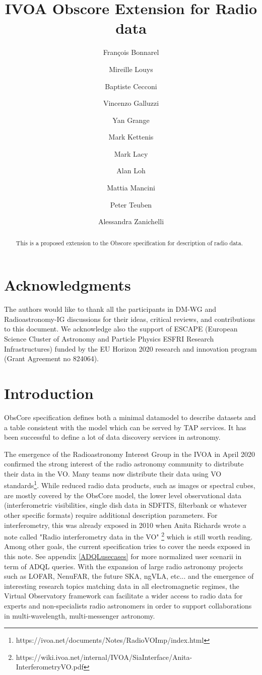 \documentclass[11pt,a4paper]{ivoa}
\title{IVOA Obscore Extension for Radio data}
\author{Fran\c cois Bonnarel}
\author{Mireille Louys}
\author{Baptiste Cecconi}
\author{Vincenzo Galluzzi}
\author{Yan Grange}
\author{Mark Kettenis}
\author{Mark Lacy}
\author{Alan Loh}
\author{Mattia Mancini}
\author{Peter Teuben}
\author{Alessandra Zanichelli}
\begin{document}
\begin{abstract}
This is a proposed extension to the Obscore specification for description of radio data.
\end{abstract}

\section*{Acknowledgments}

The authors would like to thank all the participants in DM-WG and Radioastronomy-IG discussions 
for their ideas, critical reviews, and contributions to this document.
We acknowledge also the support of  ESCAPE (European Science Cluster of Astronomy
and Particle Physics ESFRI Research Infrastructures) funded by the EU Horizon
2020 research and innovation program (Grant Agreement no 824064).

\section{Introduction}


ObsCore specification \citep{2017ivoa.spec.0509L} defines both a minimal datamodel to describe datasets 
and a table consistent with the model which can be served by TAP services. It has been successful 
to define a lot of data discovery services in astronomy.

The emergence  of  the Radioastronomy Interest Group in the IVOA in April 2020 confirmed the strong 
interest of the radio astronomy community to distribute their data in the VO. Many teams now 
distribute their data using VO standards\footnote{https://ivoa.net/documents/Notes/RadioVOImp/index.html}. 
While reduced radio data products, such as images or spectral cubes,%
are mostly covered by the ObsCore model, the lower level observational data 
(interferometric visibilities, single dish data in SDFITS, filterbank or whatever other specific formats) require additional description parameters. For interferometry, this was already exposed 
in 2010 when Anita Richards wrote a note called "Radio interferometry data in the VO" 
\footnote{https://wiki.ivoa.net/internal/IVOA/SiaInterface/Anita-InterferometryVO.pdf} which is 
still worth reading. Among other goals, the current specification tries to cover the needs exposed in this note. See appendix \ref{ADQLusecases} for more normalized user scenarii in term of ADQL queries.
With the expansion of large radio astronomy projects such as LOFAR, NenuFAR, the future SKA, ngVLA, etc...
and the emergence of interesting research topics matching data in all electromagnetic regimes, the 
Virtual Observatory framework can facilitate a wider access to radio data for experts and 
non-specialists radio astronomers in order to support collaborations in multi-wavelength, 
multi-messenger astronomy. 
\end{document}
